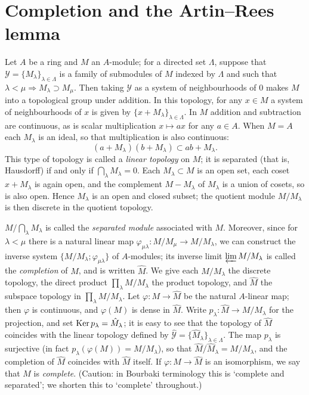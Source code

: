\section{Completion and the Artin--Rees lemma}\label{sec:8}

Let $A$ be a ring and $M$ an $A$-module; for a directed set $\Lambda$, suppose
that $\mathcal{Y} = \{M_\lambda\}_{\lambda \in \Lambda}$ is a family of submodules of $M$ indexed by $\Lambda$ and such
that $\lambda < \mu \Rightarrow M_\lambda \supset M_\mu$. Then taking $\mathcal{Y}$ as a system of neighbourhoods
of $0$ makes $M$ into a topological group under addition. In this topology, for any
$x \in M$ a system of neighbourhoods of $x$ is given by $\{x + M_\lambda\}_{\lambda \in \Lambda}$. In $M$
addition and subtraction are continuous, as is scalar multiplication $x \mapsto ax$
for any $a \in A$. When $M = A$ each $M_\lambda$ is an ideal, so that multiplication is also
continuous:
\[
  (a + M_\lambda)(b + M_\lambda) \subset ab + M_\lambda.
\]
This type of topology is called a \emph{linear topology} on $M$; it is separated
(that is, Hausdorff) if and only if $\bigcap_\lambda M_\lambda = 0$. Each $M_\lambda \subset M$ is an open set,
each coset $x + M_\lambda$ is again open, and the complement $M - M_\lambda$ of $M_\lambda$ is a
union of cosets, so is also open. Hence $M_\lambda$ is an open and closed subset;
the quotient module $M/M_\lambda$ is then discrete in the quotient topology.

$M/\bigcap_\lambda M_\lambda$ is called the \emph{separated module} associated with $M$. Moreover,
since for $\lambda < \mu$ there is a natural linear map $\varphi_{\mu\lambda}\colon M/M_\mu \to M/M_\lambda$,
we can construct the inverse system $\{M/M_\lambda; \varphi_{\mu\lambda}\}$ of $A$-modules; its
inverse limit $\varprojlim M/M_\lambda$ is called the \emph{completion} of $M$, and is written $\hat{M}$.
We give each $M/M_\lambda$ the discrete topology, the direct product $\prod_\lambda M/M_\lambda$ the
product topology, and $\hat{M}$ the subspace topology in $\prod_\lambda M/M_\lambda$.
Let $\varphi\colon M \to \hat{M}$ be the natural $A$-linear map; then $\varphi$ is continuous, and $\varphi(M)$ is
dense in $\hat{M}$. Write $p_\lambda\colon \hat{M} \to M/M_\lambda$ for the projection, and set $\operatorname{Ker} p_\lambda =
\hat{M}_\lambda$; it is easy to see that the topology of $\hat{M}$ coincides with the linear
topology defined by $\hat{\mathcal{Y}} = \{\hat{M}_\lambda\}_{\lambda \in \Lambda}$. The map $p_\lambda$ is surjective (in fact
$p_\lambda(\varphi(M)) = M/M_\lambda$), so that $\hat{M}/\hat{M}_\lambda = M/M_\lambda$, and the completion of $\hat{M}$
coincides with $\hat{M}$ itself. If $\varphi\colon M \to \hat{M}$ is an isomorphism, we say
that $M$ is \emph{complete}. (Caution: in Bourbaki terminology this is `complete and
separated'; we shorten this to `complete' throughout.)

